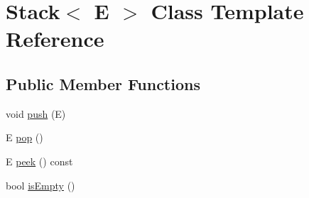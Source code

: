 \hypertarget{classStack}{\section{Stack$<$ E $>$ Class Template Reference}
\label{classStack}
}
\subsection*{Public Member Functions}
\begin{DoxyCompactItemize}
\item 
void \hyperlink{classStack_af71e3e142fba5bb861b66b4882289b31}{push} (E)
\item 
E \hyperlink{classStack_a5ba7a4c8eec39757e28f95da49f06d52}{pop} ()
\item 
E \hyperlink{classStack_a19a17240bf7045cf6a3a9497e1091433}{peek} () const 
\item 
bool \hyperlink{classStack_a0ce2804f35c0c8cfb999535f35fa438b}{is\-Empty} ()
\end{DoxyCompactItemize}


